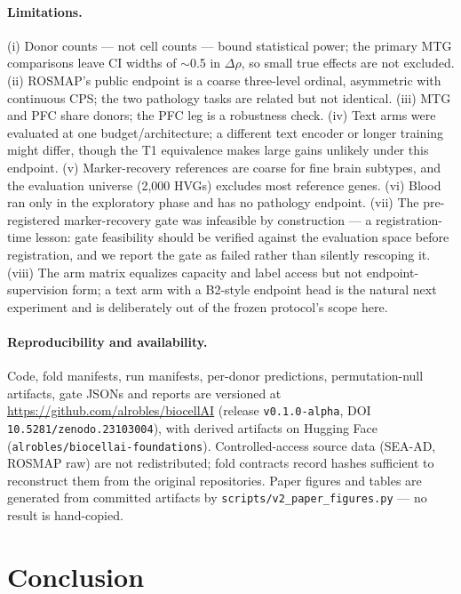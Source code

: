 \documentclass[11pt]{article}
\begin{document}
\paragraph{Limitations.}
(i) Donor counts --- not cell counts --- bound statistical power; the
primary MTG comparisons leave CI widths of $\sim$0.5 in $\Delta\rho$,
so small true effects are not excluded. (ii) ROSMAP's public endpoint
is a coarse three-level ordinal, asymmetric with continuous CPS; the
two pathology tasks are related but not identical. (iii) MTG and PFC
share donors; the PFC leg is a robustness check. (iv) Text arms were
evaluated at one budget/architecture; a different text encoder or
longer training might differ, though the T1 equivalence makes large
gains unlikely under this endpoint. (v) Marker-recovery references are
coarse for fine brain subtypes, and the evaluation universe (2{,}000
HVGs) excludes most reference genes. (vi) Blood ran only in the
exploratory phase and has no pathology endpoint. (vii) The
pre-registered marker-recovery gate was infeasible by construction ---
a registration-time lesson: gate feasibility should be verified against
the evaluation space before registration, and we report the gate as
failed rather than silently rescoping it. (viii) The arm matrix
equalizes capacity and label access but not endpoint-supervision form;
a text arm with a B2-style endpoint head is the natural next experiment
and is deliberately out of the frozen protocol's scope here.

\paragraph{Reproducibility and availability.}
Code, fold manifests, run manifests, per-donor predictions,
permutation-null artifacts, gate JSONs and reports are versioned at
\url{https://github.com/alrobles/biocellAI} (release
\texttt{v0.1.0-alpha}, DOI \texttt{10.5281/zenodo.23103004}), with
derived artifacts on Hugging Face
(\texttt{alrobles/biocellai-foundations}). Controlled-access source data
(SEA-AD, ROSMAP raw) are not redistributed; fold contracts record
hashes sufficient to reconstruct them from the original repositories.
Paper figures and tables are generated from committed artifacts by
\texttt{scripts/v2\_paper\_figures.py} --- no result is hand-copied.

\section{Conclusion}
\end{document}

